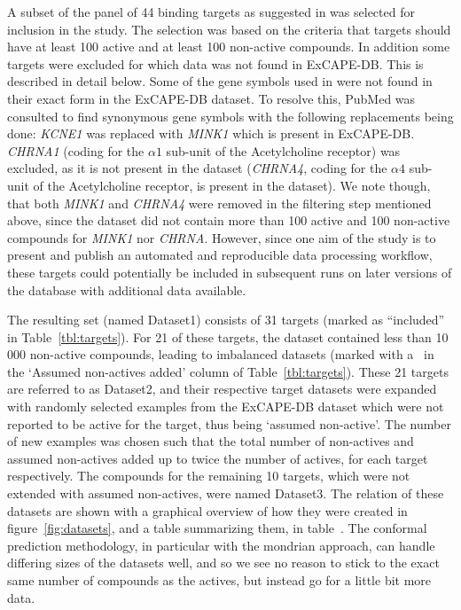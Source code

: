 \documentclass[utf8]{frontiersSCNS} %
\begin{document}
A subset of the panel of 44 binding targets as suggested in \cite{Bowes2012}
was selected for inclusion in the study. The selection was based on the
criteria that targets should have at least 100 active and at least 100
non-active compounds.  In addition some targets were excluded for which data
was not found in ExCAPE-DB. This is described in detail below.
%
Some of the gene symbols used in \cite{Bowes2012} were not found in their exact
form in the ExCAPE-DB dataset. To resolve this, PubMed was consulted to find
synonymous gene symbols with the following replacements being done:
%
\textit{KCNE1} was replaced with \textit{MINK1} which is present in ExCAPE-DB.
\textit{CHRNA1} (coding for the $\alpha1$ sub-unit of the Acetylcholine
receptor) was excluded, as it is not present in the dataset (\textit{CHRNA4},
coding for the $\alpha4$ sub-unit of the Acetylcholine receptor, is present in
the dataset). We note though, that both \textit{MINK1} and \textit{CHRNA4} were removed
in the filtering step mentioned above, since the dataset did not contain more
than 100 active and 100 non-active compounds for \textit{MINK1} nor
\textit{CHRNA}.  However, since one aim of the study is to present and publish
an automated and reproducible data processing workflow, these targets could
potentially be included in subsequent runs on later versions of the database
with additional data available.

The resulting set (named Dataset1) consists of 31 targets (marked as
``included'' in Table~\ref{tbl:targets}). For 21 of these targets, the
dataset contained less than 10\,000 non-active compounds, leading to
imbalanced datasets (marked with a \checkmark\ in the `Assumed non-actives
added' column of Table~\ref{tbl:targets}). These 21 targets are referred to
as Dataset2, and their respective target datasets were expanded with randomly
selected examples from the ExCAPE-DB dataset which were not reported to be
active for the target, thus being `assumed non-active'. The number of new
examples was chosen such that the total number of non-actives and assumed
non-actives added up to twice the number of actives, for each target
respectively. The compounds for the remaining 10 targets, which were not
extended with assumed non-actives, were named Dataset3. The relation of these
datasets are shown with a graphical overview of how they were created in
figure~\ref{fig:datasets}, and a table summarizing them, in
table~\cite{tbl:datasets}.
%
The conformal prediction methodology, in particular with the mondrian
approach, can handle differing sizes of the datasets well, and so we see no
reason to stick to the exact same number of compounds as the actives, but
instead go for a little bit more data.
\end{document}
